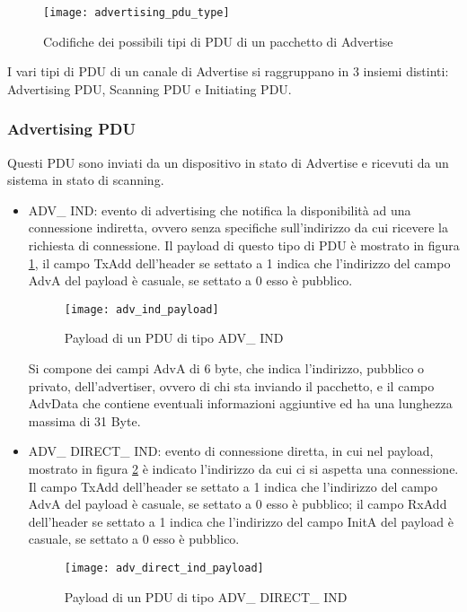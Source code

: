 \begin{figure}[H]
\texttt{[image: advertising\_pdu\_type]}
\centering
\caption{Codifiche dei possibili tipi di PDU di un pacchetto di Advertise}
\end{figure}
 
I vari tipi di PDU di un canale di Advertise si raggruppano in 3 insiemi distinti: Advertising PDU, Scanning PDU e Initiating PDU.

\subsubsection{Advertising PDU}

Questi PDU sono inviati da un dispositivo in stato di Advertise e ricevuti da un sistema in stato di scanning.

\begin{itemize}
\item ADV\_ IND: evento di advertising che notifica la disponibilità ad una connessione indiretta, ovvero senza specifiche sull'indirizzo da cui ricevere la richiesta di connessione.
Il payload di questo tipo di PDU è mostrato in figura \ref{adv_ind_payload}, il campo TxAdd dell'header se settato a 1 indica che l'indirizzo del campo AdvA del payload è casuale, se settato a 0 esso è pubblico.

\begin{figure}[H]
\texttt{[image: adv\_ind\_payload]}
\centering
\caption{Payload di un PDU di tipo ADV\_ IND }
\label{adv_ind_payload}
\end{figure}

Si compone dei campi AdvA di 6 byte, che indica l'indirizzo, pubblico o privato, dell'advertiser, ovvero di chi sta inviando il pacchetto, e il campo AdvData che contiene eventuali informazioni aggiuntive ed ha una lunghezza massima di 31 Byte.

\item ADV\_ DIRECT\_ IND: evento di connessione diretta, in cui nel payload, mostrato in figura \ref{adv_direct_ind_payload} è indicato l'indirizzo da cui ci si aspetta una connessione. Il campo TxAdd dell'header se settato a 1 indica che l'indirizzo del campo AdvA del payload è casuale, se settato a 0 esso è pubblico;
il campo RxAdd dell'header se settato a 1 indica che l'indirizzo del campo InitA del payload è casuale, se settato a 0 esso è pubblico. 

\begin{figure}[H]
\texttt{[image: adv\_direct\_ind\_payload]}
\centering
\caption{Payload di un PDU di tipo ADV\_ DIRECT\_ IND }
\label{adv_direct_ind_payload}
\end{figure}


\end{itemize}
